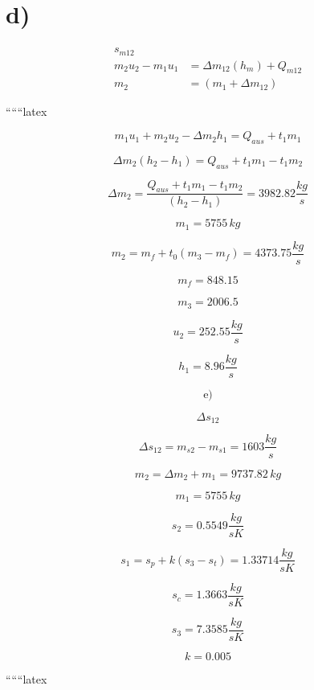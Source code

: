 

\section*{d)}
\begin{align*}
s_{m12} \\
m_2 u_2 - m_1 u_1 &= \Delta m_{12} (h_m) + Q_{m12} \\
m_2 &= (m_1 + \Delta m_{12})
\end{align*}

``````latex


\[
m_1 u_1 + m_2 u_2 - \Delta m_2 h_1 = Q_{aus} + t_1 m_1
\]

\[
\Delta m_2 (h_2 - h_1) = Q_{aus} + t_1 m_1 - t_1 m_2
\]

\[
\Delta m_2 = \frac{Q_{aus} + t_1 m_1 - t_1 m_2}{(h_2 - h_1)} = 3982.82 \frac{kg}{s}
\]

\[
m_1 = 5755 \, kg
\]

\[
m_2 = m_f + t_0 (m_3 - m_f) = 4373.75 \frac{kg}{s}
\]

\[
m_f = 848.15
\]

\[
m_3 = 2006.5
\]

\[
u_2 = 252.55 \frac{kg}{s}
\]

\[
h_1 = 8.96 \frac{kg}{s}
\]

\[
\text{e)}
\]

\[
\Delta s_{12}
\]

\[
\Delta s_{12} = m_{s2} - m_{s1} = 1603 \frac{kg}{s}
\]

\[
m_2 = \Delta m_2 + m_1 = 9737.82 \, kg
\]

\[
m_1 = 5755 \, kg
\]

\[
s_2 = 0.5549 \frac{kg}{sK}
\]

\[
s_1 = s_p + k(s_3 - s_t) = 1.33714 \frac{kg}{sK}
\]

\[
s_c = 1.3663 \frac{kg}{sK}
\]

\[
s_3 = 7.3585 \frac{kg}{sK}
\]

\[
k = 0.005
\]

``````latex